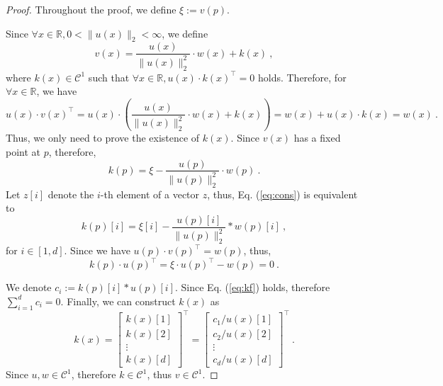 \begin{proof}
Throughout the proof, we define $\xi := v(p)$.

Since $\forall x \in \mathbb{R}, 0 <\|u(x)\|_2 < \infty$, we define
\begin{equation}
v(x) = \frac{u(x)}{\|u(x)\|_2^2} \cdot w(x) + k(x) ~,
\end{equation}
where $k(x) \in \mathcal{C}^1$ such that $\forall x \in \mathbb{R}, u(x) \cdot k(x)^\top=0$ holds. Therefore, for $\forall x  \in \mathbb{R}$, we have
\begin{equation}
u(x) \cdot v(x)^\top = u(x) \cdot \left( \frac{u(x)}{\|u(x)\|_2^2} \cdot w(x) + k(x) \right) = w(x) + u(x) \cdot k(x) = w(x) ~.
\end{equation}
Thus, we only need to prove the existence of $k(x)$. Since $v(x)$ has a fixed point at $p$, therefore,
\begin{equation}
k(p) = \xi - \frac{u(p)}{\|u(p)\|_2^2} \cdot w(p) ~.
\label{eq:cons}
\end{equation}
Let $z[i]$ denote the $i$-th element of a vector $z$, thus, Eq. (\ref{eq:cons}) is equivalent to
\begin{equation}
k(p)[i] = \xi[i] - \frac{u(p)[i]}{\|u(p)\|_2^2} * w(p)[i] ~,
\end{equation}
for $i \in [1, d]$. Since we have $u(p) \cdot v(p)^\top = w(p)$, thus,
\begin{equation}
k(p) \cdot u(p)^\top = \xi \cdot u(p)^\top - w(p) = 0 ~.
\label{eq:kf}
\end{equation}

We denote $c_i := k(p)[i] * u(p)[i]$. Since Eq. (\ref{eq:kf}) holds, therefore $\sum_{i=1}^{d} c_i=0$. Finally, we can construct $k(x)$ as
\begin{equation}
k(x) = \left[\begin{array}{cccc}
k(x)[1]  \\ 
k(x)[2] \\ 
\vdots  \\
k(x)[d] \end{array}\right]^\top = \left[\begin{array}{cccc}
c_1 / u(x)[1]  \\ 
c_2 / u(x)[2] \\ 
\vdots  \\
c_d / u(x)[d] \end{array}\right]^\top ~.
\end{equation}
Since $u, w \in \mathcal{C}^1$, therefore $k \in \mathcal{C}^1$, thus $v \in \mathcal{C}^1$.
\end{proof}


